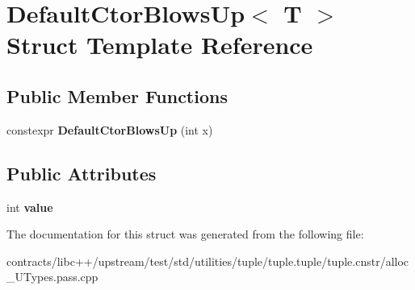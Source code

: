 \hypertarget{struct_default_ctor_blows_up}{}\section{Default\+Ctor\+Blows\+Up$<$ T $>$ Struct Template Reference}
\label{struct_default_ctor_blows_up}
\subsection*{Public Member Functions}
\begin{DoxyCompactItemize}
\item 
\mbox{\label{struct_default_ctor_blows_up_a49b528cc7edc3bf65c1e8b6f11ceff56}} 
constexpr {\bfseries Default\+Ctor\+Blows\+Up} (int x)
\end{DoxyCompactItemize}
\subsection*{Public Attributes}
\begin{DoxyCompactItemize}
\item 
\mbox{\label{struct_default_ctor_blows_up_a3cdf5a6e5cedc030ae3ef7cb222bbcc9}} 
int {\bfseries value}
\end{DoxyCompactItemize}


The documentation for this struct was generated from the following file\+:\begin{DoxyCompactItemize}
\item 
contracts/libc++/upstream/test/std/utilities/tuple/tuple.\+tuple/tuple.\+cnstr/alloc\+\_\+\+U\+Types.\+pass.\+cpp\end{DoxyCompactItemize}
